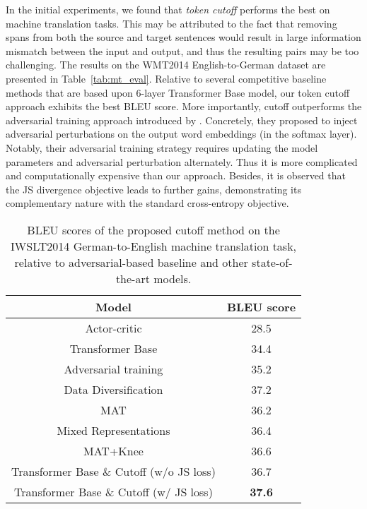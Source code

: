 \documentclass[11pt,a4paper]{article}
\newcommand{\tf}[1]{\textbf{#1}}
\begin{document}
In the initial experiments, we found that \emph{token cutoff} performs the best on machine translation tasks. This may be attributed to the fact that removing spans from both the source and target sentences would result in large information mismatch between the input and output, and thus the resulting pairs may be too challenging. The results on the WMT2014 English-to-German dataset are presented in Table~\ref{tab:mt_eval}. Relative to several competitive baseline methods that are based upon $6$-layer Transformer Base model, our token cutoff approach exhibits the best BLEU score. More importantly, cutoff outperforms the adversarial training approach introduced by \cite{Wang2019ImprovingNL}. Concretely, they proposed to inject adversarial perturbations on the output word embeddings (in the softmax layer). Notably, their adversarial training strategy requires updating the model parameters and adversarial perturbation alternately. Thus it is more complicated and computationally expensive than our approach. Besides, it is observed that the JS divergence objective leads to further gains, demonstrating its complementary nature with the standard cross-entropy objective.
\begin{table}[ht!]
	\centering
	\begin{small}
		\vspace{0mm}
		\setlength{\tabcolsep}{6pt}
		\def\arraystretch{1.18}
		\begin{tabular}{c||c}
			\toprule[1.2pt]
			\tf{Model} & \tf{BLEU score} \\
			\hline
			Actor-critic \cite{bahdanau2016actor} & 28.5 \\
			Transformer Base \cite{vaswani2017attention} & 34.4 \\
			Adversarial training \cite{Wang2019ImprovingNL} & 35.2 \\
			Data Diversification \cite{Nguyen2019DataDA} & 37.2 \\
			MAT \cite{fan2020multi} & 36.2 \\
			Mixed Representations \cite{wu2020sequence} & 36.4 \\
			MAT+Knee \cite{iyer2020wide} & 36.6 \\
			\hline
			Transformer Base \& Cutoff (w/o  JS loss) & 36.7 \\
    		Transformer Base \& Cutoff (w/  JS loss) & \textbf{37.6} \\
			\bottomrule[1.2pt]
		\end{tabular}\caption{BLEU scores of the proposed cutoff method on the IWSLT2014 German-to-English machine translation task, relative to adversarial-based baseline and other state-of-the-art models.}
		\label{tab:mt_eval_2}
	\end{small}
	\vspace{-2mm}
\end{table}
\end{document}
